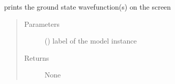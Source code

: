 \documentclass[letterpaper,10pt,english]{sphinxmanual}
\begin{document}
\begin{fulllineitems}
\label{\detokenize{functions:pyqcm.print_wavefunction}}
\sphinxAtStartPar
prints the ground state wavefunction(s) on the screen
\begin{quote}\begin{description}
\item[{Parameters}] \leavevmode
\sphinxAtStartPar
{} () \textendash{} label of the model instance

\item[{Returns}] \leavevmode
\sphinxAtStartPar
None

\end{description}\end{quote}

\end{fulllineitems}

\end{document}
